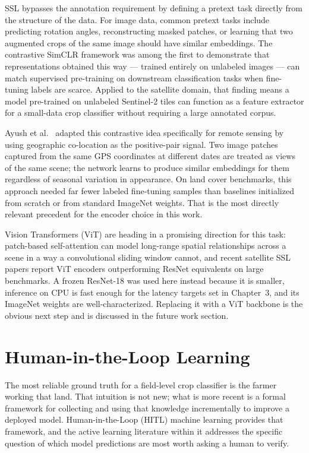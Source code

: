 \documentclass[12pt,a4paper,oneside]{report}
\begin{document}
SSL bypasses the annotation requirement by defining a pretext task directly from
the structure of the data. For image data, common pretext tasks include predicting
rotation angles, reconstructing masked patches, or learning that two augmented crops
of the same image should have similar embeddings. The contrastive SimCLR framework
\cite{chen2020simclr} was among the first to demonstrate that representations
obtained this way — trained entirely on unlabeled images — can match supervised
pre-training on downstream classification tasks when fine-tuning labels are scarce.
Applied to the satellite domain, that finding means a model pre-trained on unlabeled
Sentinel-2 tiles can function as a feature extractor for a small-data crop classifier
without requiring a large annotated corpus.

Ayush et al.\ \cite{ayush2021geography} adapted this contrastive idea specifically
for remote sensing by using geographic co-location as the positive-pair signal. Two
image patches captured from the same GPS coordinates at different dates are treated
as views of the same scene; the network learns to produce similar embeddings for
them regardless of seasonal variation in appearance. On land cover benchmarks, this
approach needed far fewer labeled fine-tuning samples than baselines initialized from
scratch or from standard ImageNet weights. That is the most directly relevant
precedent for the encoder choice in this work.

Vision Transformers (ViT) \cite{dosovitskiy2020vit} are heading in a promising
direction for this task: patch-based self-attention can model long-range spatial
relationships across a scene in a way a convolutional sliding window cannot, and
recent satellite SSL papers report ViT encoders outperforming ResNet equivalents on
large benchmarks. A frozen ResNet-18 was used here instead because it is smaller,
inference on CPU is fast enough for the latency targets set in Chapter~3, and its
ImageNet weights are well-characterized. Replacing it with a ViT backbone is the
obvious next step and is discussed in the future work section.

\section{Human-in-the-Loop Learning}

The most reliable ground truth for a field-level crop classifier is the farmer working that land. That intuition is not new; what is more recent is a formal framework for collecting and using that knowledge incrementally to improve a deployed model. Human-in-the-Loop (HITL) machine learning provides that framework, and the active learning literature within it addresses the specific question of which model predictions are most worth asking a human to verify.
\end{document}
